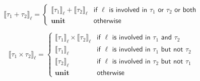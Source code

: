 \documentclass{article}
\begin{document}
$$
 \llbracket  \tau_1 + \tau_2 \rrbracket _\ell = \left\{
    \begin{array}{ll}
    \llbracket  \tau_1 \rrbracket_\ell + \llbracket  \tau_2 \rrbracket _\ell & \textsf{if } \ell \textsf{ is involved in } \tau_1 \textsf{ or } \tau_2 \textsf{ or both}\\
    \textbf{unit} & \textsf{otherwise}
    \end{array}
\right.
$$

$$
 \llbracket  \tau_1 \times \tau_2 \rrbracket _\ell = \left\{
    \begin{array}{ll}
    \llbracket  \tau_1 \rrbracket_\ell \times \llbracket  \tau_2 \rrbracket _\ell & \textsf{if } \ell \textsf{ is involved in } \tau_1 \textsf{ and } \tau_2 \\
    \llbracket  \tau_1 \rrbracket_\ell & \textsf{if } \ell \textsf{ is involved in } \tau_1 \textsf{ but not } \tau_2 \\
    \llbracket  \tau_2 \rrbracket_\ell & \textsf{if } \ell \textsf{ is involved in } \tau_2 \textsf{ but not } \tau_1 \\
    \textbf{unit} & \textsf{otherwise}
    \end{array}
\right.
$$
\end{document}
